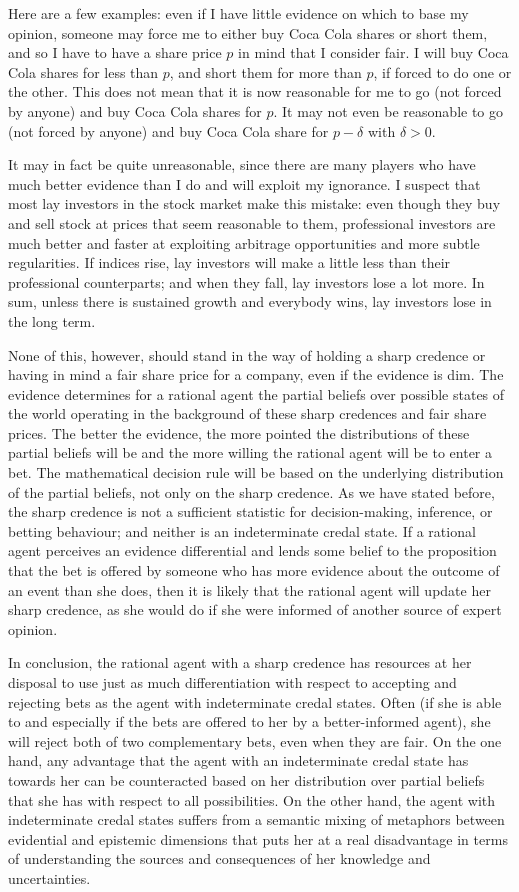Here are a few examples: even if I have little evidence
on which to base my opinion, someone may force me to
either buy Coca Cola shares or short them, and so I
have to have a share price $p$ in mind that I consider
fair. I will buy Coca Cola shares for less than $p$,
and short them for more than $p$, if forced to do one
or the other. This does not mean that it is now
reasonable for me to go (not forced by anyone) and buy
Coca Cola shares for $p$. It may not even be reasonable
to go (not forced by anyone) and buy Coca Cola share
for $p-\delta$ with $\delta{}>0$.

It may in fact be quite unreasonable, since there are
many players who have much better evidence than I do
and will exploit my ignorance. I suspect that most lay
investors in the stock market make this mistake: even
though they buy and sell stock at prices that seem
reasonable to them, professional investors are much
better and faster at exploiting arbitrage opportunities
and more subtle regularities. If indices rise, lay
investors will make a little less than their
professional counterparts; and when they fall, lay
investors lose a lot more. In sum, unless there is
sustained growth and everybody wins, lay investors lose
in the long term.

None of this, however, should stand in the way of
holding a sharp credence or having in mind a fair share
price for a company, even if the evidence is dim. The
evidence determines for a rational agent the partial
beliefs over possible states of the world operating in
the background of these sharp credences and fair share
prices. The better the evidence, the more pointed the
distributions of these partial beliefs will be and the
more willing the rational agent will be to enter a bet.
The mathematical decision rule will be based on the
underlying distribution of the partial beliefs, not
only on the sharp credence. As we have stated before,
the sharp credence is not a sufficient statistic for
decision-making, inference, or betting behaviour; and
neither is an indeterminate credal state. If a rational
agent perceives an evidence differential and lends some
belief to the proposition that the bet is offered by
someone who has more evidence about the outcome of an
event than she does, then it is likely that the
rational agent will update her sharp credence, as she
would do if she were informed of another source of
expert opinion.

In conclusion, the rational agent with a sharp credence
has resources at her disposal to use just as much
differentiation with respect to accepting and rejecting
bets as the agent with indeterminate credal states.
Often (if she is able to and especially if the bets are
offered to her by a better-informed agent), she will
reject both of two complementary bets, even when they
are fair. On the one hand, any advantage that the agent
with an indeterminate credal state has towards her can
be counteracted based on her distribution over partial
beliefs that she has with respect to all possibilities.
On the other hand, the agent with indeterminate credal
states suffers from a semantic mixing of metaphors
between evidential and epistemic dimensions that puts
her at a real disadvantage in terms of understanding
the sources and consequences of her knowledge and
uncertainties.
